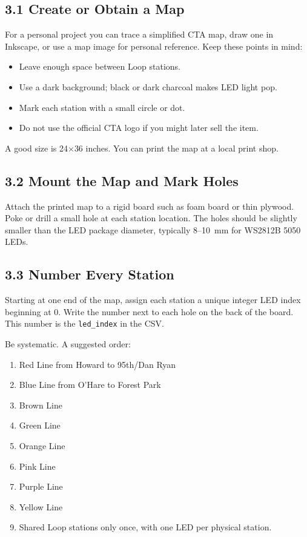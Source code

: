 \documentclass[11pt]{article}
\begin{document}
\subsection{3.1 Create or Obtain a Map}

For a personal project you can trace a simplified CTA map, draw one in Inkscape, or use a map image for personal reference. Keep these points in mind:

\begin{itemize}
    \item Leave enough space between Loop stations.
    \item Use a dark background; black or dark charcoal makes LED light pop.
    \item Mark each station with a small circle or dot.
    \item Do not use the official CTA logo if you might later sell the item.
\end{itemize}

A good size is 24$\times$36 inches. You can print the map at a local print shop.

\subsection{3.2 Mount the Map and Mark Holes}

Attach the printed map to a rigid board such as foam board or thin plywood. Poke or drill a small hole at each station location. The holes should be slightly smaller than the LED package diameter, typically 8--10~mm for WS2812B 5050 LEDs.

\subsection{3.3 Number Every Station}

Starting at one end of the map, assign each station a unique integer LED index beginning at 0. Write the number next to each hole on the back of the board. This number is the \texttt{led\_index} in the CSV.

Be systematic. A suggested order:

\begin{enumerate}
    \item Red Line from Howard to 95th/Dan Ryan
    \item Blue Line from O'Hare to Forest Park
    \item Brown Line
    \item Green Line
    \item Orange Line
    \item Pink Line
    \item Purple Line
    \item Yellow Line
    \item Shared Loop stations only once, with one LED per physical station.
\end{enumerate}
\end{document}
